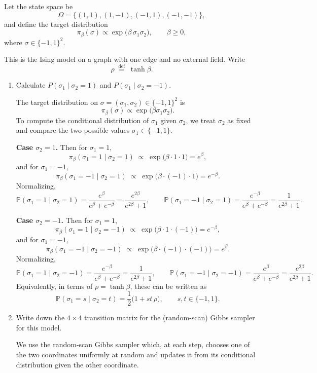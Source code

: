 \documentclass[answers,12pt,addpoints]{exam}
\begin{document}
Let the state space be
\[
\Omega = \{(1,1), (1,-1), (-1,1), (-1,-1)\},
\]
and define the target distribution
\[
\pi_\beta(\sigma) \propto \exp\bigl( \beta\, \sigma_1 \sigma_2 \bigr), \qquad \beta \ge 0,
\]
where $\sigma \in \{-1,1\}^2$.

This is the Ising model on a graph with one edge and no external field. Write
\[
\rho \;\stackrel{\text{def}}{=}\; \tanh \beta.
\]

\begin{enumerate}
    \item Calculate $P(\sigma_1 \mid \sigma_2 = 1)$ and $P(\sigma_1 \mid \sigma_2 = -1)$.
    \begin{solution}
        The target distribution on $\sigma = (\sigma_1,\sigma_2) \in \{-1,1\}^2$ is
\[
\pi_\beta(\sigma) \propto \exp\bigl(\beta \sigma_1 \sigma_2\bigr).
\]
To compute the conditional distribution of $\sigma_1$ given $\sigma_2$, we
treat $\sigma_2$ as fixed and compare the two possible values
$\sigma_1 \in \{-1,1\}$.

\medskip
\noindent\textbf{Case $\sigma_2 = 1$.}
Then for $\sigma_1 = 1$,
\[
\pi_\beta(\sigma_1=1 \mid \sigma_2=1)
\;\propto\;
\exp\bigl(\beta \cdot 1 \cdot 1\bigr)
= e^{\beta},
\]
and for $\sigma_1 = -1$,
\[
\pi_\beta(\sigma_1=-1 \mid \sigma_2=1)
\;\propto\;
\exp\bigl(\beta \cdot (-1) \cdot 1\bigr)
= e^{-\beta}.
\]
Normalizing,
\[
\mathbb{P}(\sigma_1 = 1 \mid \sigma_2 = 1)
= \frac{e^{\beta}}{e^{\beta} + e^{-\beta}}
= \frac{e^{2\beta}}{e^{2\beta} + 1},
\qquad
\mathbb{P}(\sigma_1 = -1 \mid \sigma_2 = 1)
= \frac{e^{-\beta}}{e^{\beta} + e^{-\beta}}
= \frac{1}{e^{2\beta} + 1}.
\]

\medskip
\noindent\textbf{Case $\sigma_2 = -1$.}
Then for $\sigma_1 = 1$,
\[
\pi_\beta(\sigma_1=1 \mid \sigma_2=-1)
\;\propto\;
\exp\bigl(\beta \cdot 1 \cdot (-1)\bigr)
= e^{-\beta},
\]
and for $\sigma_1 = -1$,
\[
\pi_\beta(\sigma_1=-1 \mid \sigma_2=-1)
\;\propto\;
\exp\bigl(\beta \cdot (-1) \cdot (-1)\bigr)
= e^{\beta}.
\]
Normalizing,
\[
\mathbb{P}(\sigma_1 = 1 \mid \sigma_2 = -1)
= \frac{e^{-\beta}}{e^{\beta} + e^{-\beta}}
= \frac{1}{e^{2\beta} + 1},
\qquad
\mathbb{P}(\sigma_1 = -1 \mid \sigma_2 = -1)
= \frac{e^{\beta}}{e^{\beta} + e^{-\beta}}
= \frac{e^{2\beta}}{e^{2\beta} + 1}.
\]
Equivalently, in terms of $\rho = \tanh \beta$, these can be written as
\[
\mathbb{P}(\sigma_1 = s \mid \sigma_2 = t)
= \frac{1}{2}\bigl(1 + s t\, \rho\bigr),
\qquad s,t \in \{-1,1\}.
\]
    \end{solution}
    \item Write down the $4 \times 4$ transition matrix for the (random-scan) Gibbs sampler for this model.
    \begin{solution}
        We use the random-scan Gibbs sampler which, at each step, chooses one of the
two coordinates uniformly at random and updates it from its conditional
distribution given the other coordinate.


\end{solution}
\end{enumerate}
\end{document}

